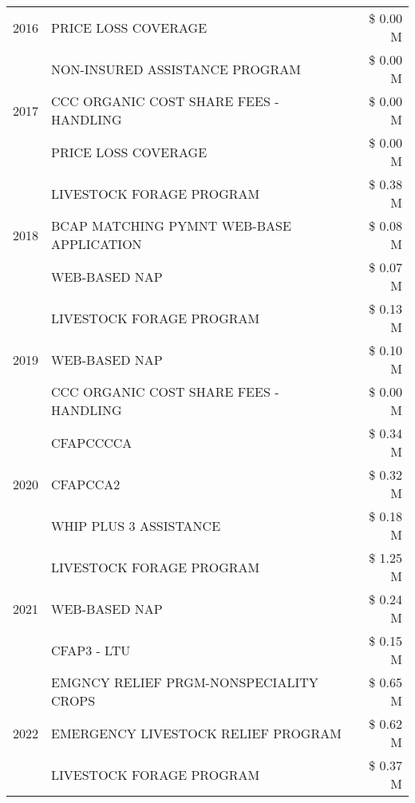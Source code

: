 \begin{tabular}{llr}
2016 & PRICE LOSS COVERAGE & \$ 0.00 M \\
\cline{1-3}
\multirow[t]{3}{*}{2017} & NON-INSURED ASSISTANCE PROGRAM & \$ 0.00 M \\
 & CCC ORGANIC COST SHARE FEES - HANDLING & \$ 0.00 M \\
 & PRICE LOSS COVERAGE & \$ 0.00 M \\
\cline{1-3}
\multirow[t]{3}{*}{2018} & LIVESTOCK FORAGE PROGRAM & \$ 0.38 M \\
 & BCAP MATCHING PYMNT WEB-BASE APPLICATION & \$ 0.08 M \\
 & WEB-BASED NAP & \$ 0.07 M \\
\cline{1-3}
\multirow[t]{3}{*}{2019} & LIVESTOCK FORAGE PROGRAM & \$ 0.13 M \\
 & WEB-BASED NAP & \$ 0.10 M \\
 & CCC ORGANIC COST SHARE FEES - HANDLING & \$ 0.00 M \\
\cline{1-3}
\multirow[t]{3}{*}{2020} & CFAPCCCCA & \$ 0.34 M \\
 & CFAPCCA2 & \$ 0.32 M \\
 & WHIP PLUS 3 ASSISTANCE & \$ 0.18 M \\
\cline{1-3}
\multirow[t]{3}{*}{2021} & LIVESTOCK FORAGE PROGRAM & \$ 1.25 M \\
 & WEB-BASED NAP & \$ 0.24 M \\
 & CFAP3 - LTU & \$ 0.15 M \\
\cline{1-3}
\multirow[t]{3}{*}{2022} & EMGNCY RELIEF PRGM-NONSPECIALITY CROPS & \$ 0.65 M \\
 & EMERGENCY LIVESTOCK RELIEF PROGRAM & \$ 0.62 M \\
 & LIVESTOCK FORAGE PROGRAM & \$ 0.37 M \\
\cline{1-3}
\bottomrule
\end{tabular}
